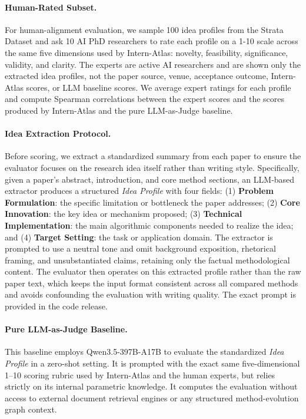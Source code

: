 \documentclass{opendatalab}
\begin{document}
\paragraph{Human-Rated Subset.}
For human-alignment evaluation, we sample 100 idea profiles from the Strata Dataset and ask 10 AI PhD researchers to rate each profile on a 1-10 scale across the same five dimensions used by Intern-Atlas: novelty, feasibility, significance, validity, and clarity. The experts are active AI researchers and are shown only the extracted idea profiles, not the paper source, venue, acceptance outcome, Intern-Atlas scores, or LLM baseline scores. We average expert ratings for each profile and compute Spearman correlations between the expert scores and the scores produced by Intern-Atlas and the pure LLM-as-Judge baseline.

\paragraph{Idea Extraction Protocol.}
Before scoring, we extract a standardized summary from each paper to ensure the evaluator focuses on the research idea itself rather than writing style. Specifically, given a paper's abstract, introduction, and core method sections, an LLM-based extractor produces a structured \emph{Idea Profile} with four fields: (1) \textbf{Problem Formulation}: the specific limitation or bottleneck the paper addresses; (2) \textbf{Core Innovation}: the key idea or mechanism proposed; (3) \textbf{Technical Implementation}: the main algorithmic components needed to realize the idea; and (4) \textbf{Target Setting}: the task or application domain.
The extractor is prompted to use a neutral tone and omit background exposition, rhetorical framing, and unsubstantiated claims, retaining only the factual methodological content. The evaluator then operates on this extracted profile rather than the raw paper text, which keeps the input format consistent across all compared methods and avoids confounding the evaluation with writing quality. The exact prompt is provided in the code release.

\paragraph{Pure LLM-as-Judge Baseline.}
This baseline employs Qwen3.5-397B-A17B to evaluate the standardized \emph{Idea Profile} in a zero-shot setting. It is prompted with the exact same five-dimensional 1--10 scoring rubric used by Intern-Atlas and the human experts, but relies strictly on its internal parametric knowledge. It computes the evaluation without access to external document retrieval engines or any structured method-evolution graph context.
\end{document}
